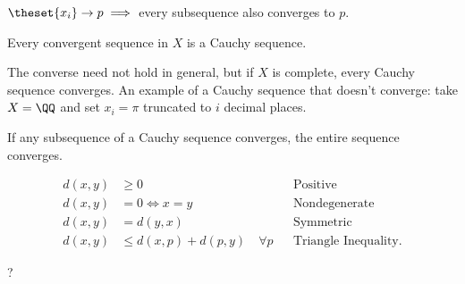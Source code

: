 \begin{proposition}

\(\theset{x_i} \to p \implies\) every subsequence also converges to
\(p\).

\end{proposition}

\begin{definition}


\end{definition}

\begin{proposition}[?]

Every convergent sequence in \(X\) is a Cauchy sequence.

\end{proposition}

\begin{remark}

The converse need not hold in general, but if \(X\) is complete, every
Cauchy sequence converges. An example of a Cauchy sequence that doesn't
converge: take \(X=\QQ\) and set \(x_i = \pi\) truncated to \(i\)
decimal places.

\end{remark}

\begin{remark}

If any subsequence of a Cauchy sequence converges, the entire sequence
converges.

\end{remark}

\begin{definition}[Metric]

\begin{align*}  
d(x,y) &\geq 0 && \text{Positive}\\
d(x,y) &= 0 \iff x = y && \text{Nondegenerate}\\
d(x,y) &= d(y,x) && \text{Symmetric}\\
d(x,y) &\leq d(x,p) + d(p,y) \quad \forall p && \text{Triangle Inequality}
.\end{align*}

\end{definition}

\begin{definition}[Complete]

? 

\end{definition}


